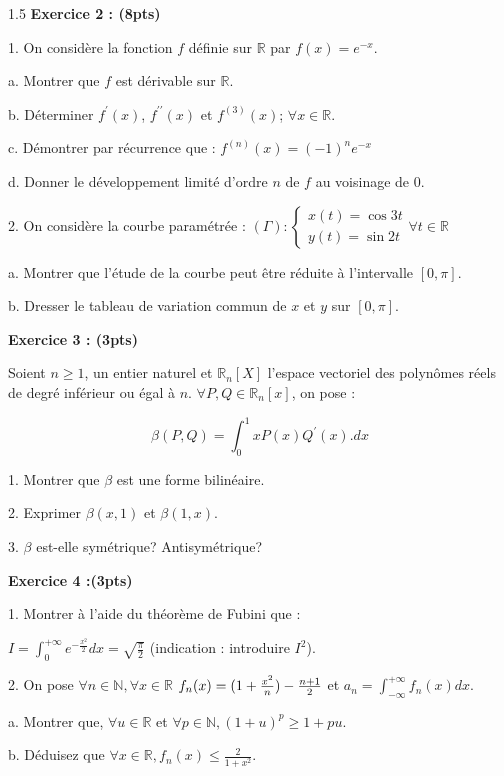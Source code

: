 \documentclass[12pt]{article}
\begin{document}
\begin{spacing}{1.5}
\textbf{Exercice 2 : (8pts)}

1. On considère la fonction $f$ définie sur $\mathbb{R}$ par $f(x)=e^{-x}$.

a. Montrer que $f$ est dérivable sur $\mathbb{R}$.

b. Déterminer $f^\prime(x)$, $f^{\prime\prime}(x)$ et $f^{(3)}(x)$; $\forall {x}\in \mathbb{R}$.

c. Démontrer par récurrence que : $f^{(n)}(x)=(-1)^ne^{-x}$



d. Donner le développement limité d'ordre $n$ de $f$ au voisinage de $0$.

2. On considère la courbe paramétrée : $(\Gamma) :\begin{cases}
x(t)=\cos 3t\\
y(t)=\sin 2t
\end{cases} \forall t\in \mathbb{R}$

a. Montrer que l'étude de la courbe peut être réduite à l'intervalle $[0,\pi]$.

b. Dresser le tableau de variation commun de $x$ et $y$ sur $[0,\pi]$.

\textbf{Exercice 3 : (3pts)}

Soient $n\geq 1$, un entier naturel et $\mathbb{R}_n[X]$ l'espace vectoriel des polynômes réels de degré inférieur ou égal à $n$. $\forall {P,Q\in \mathbb{R}_n[x]}$, on pose :

\[ \beta(P,Q)=\int_{0}^{1}xP(x)Q^{\prime}(x). dx\]

1. Montrer que $\beta$ est une forme bilinéaire.

2. Exprimer $\beta(x,1)$ et $\beta(1,x)$.

3. $\beta$ est-elle symétrique? Antisymétrique?

\textbf{Exercice 4 :(3pts)}

1. Montrer à l'aide du théorème de Fubini que : 

$I=\int_{0}^{+\infty}e^{-\frac{x^2}{2}}dx=\sqrt{\frac{\pi}{2}}$ (indication : introduire $I^2$).

2. On pose $\forall {n\in \mathbb{N}}, \forall {x\in \mathbb{R}}$ $\\
f_n(x)=(1+\frac{x^2}{n})-\frac{n+1}{2}$ et $a_n=\int_{-\infty}^{+\infty}f_n(x)dx.$

a. Montrer que, $\forall {u\in \mathbb{R}}$ et $\forall {p\in \mathbb{N}}, (1+u)^p\geq 1+pu$.

b. Déduisez que $\forall {x\in \mathbb{R}}, f_n(x) \leq \frac{2}{1+x^2}$.


\end{spacing}
\end{document}
